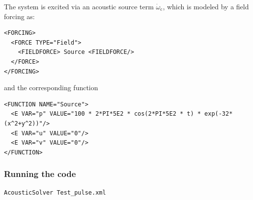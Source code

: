 The system is excited via an acoustic source term $\dot{\omega}_\mathrm{c}$, which is modeled by a field forcing as:
\begin{lstlisting}[style=XMLStyle]
<FORCING>
  <FORCE TYPE="Field">
    <FIELDFORCE> Source <FIELDFORCE/>
  </FORCE>
</FORCING>
\end{lstlisting}
and the corresponding function
\begin{lstlisting}[style=XMLStyle]
<FUNCTION NAME="Source">
  <E VAR="p" VALUE="100 * 2*PI*5E2 * cos(2*PI*5E2 * t) * exp(-32*(x^2+y^2))"/>
  <E VAR="u" VALUE="0"/>
  <E VAR="v" VALUE="0"/>
</FUNCTION>
\end{lstlisting}

\subsubsection{Running the code}
\begin{lstlisting}[style=BashInputStyle]
AcousticSolver Test_pulse.xml
\end{lstlisting}

